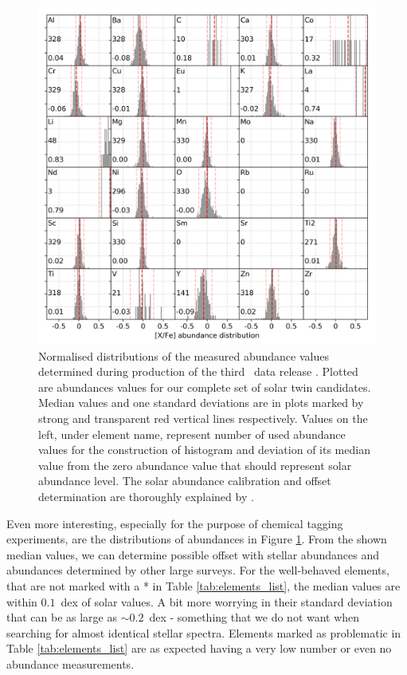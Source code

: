 \begin{figure}
	\centering
	\includegraphics[width=\textwidth]{abund_all_selection_ebv_c3.png}
	\caption{Normalised distributions of the measured abundance values determined during production of the third \Gh\ data release \protect\cite{buder2020}. Plotted are abundances values for our complete set of solar twin candidates. Median values and one standard deviations are in plots marked by strong and transparent red vertical lines respectively. Values on the left, under element name, represent number of used abundance values for the construction of histogram and deviation of its median value from the zero abundance value that should represent solar abundance level. The solar abundance calibration and offset determination are thoroughly explained by \protect\citet{buder2020}.}
	\label{fig:abund_candidates}
\end{figure}

Even more interesting, especially for the purpose of chemical tagging experiments, are the distributions of abundances in Figure \ref{fig:abund_candidates}. From the shown median values, we can determine possible offset with stellar abundances and abundances determined by other large surveys. For the well-behaved elements, that are not marked with a * in Table \ref{tab:elements_list}, the median values are within $0.1$~dex of solar values. A bit more worrying in their standard deviation that can be as large as $\sim0.2$~dex - something that we do not want when searching for almost identical stellar spectra. Elements marked as problematic in Table \ref{tab:elements_list} are as expected having a very low number or even no abundance measurements.

